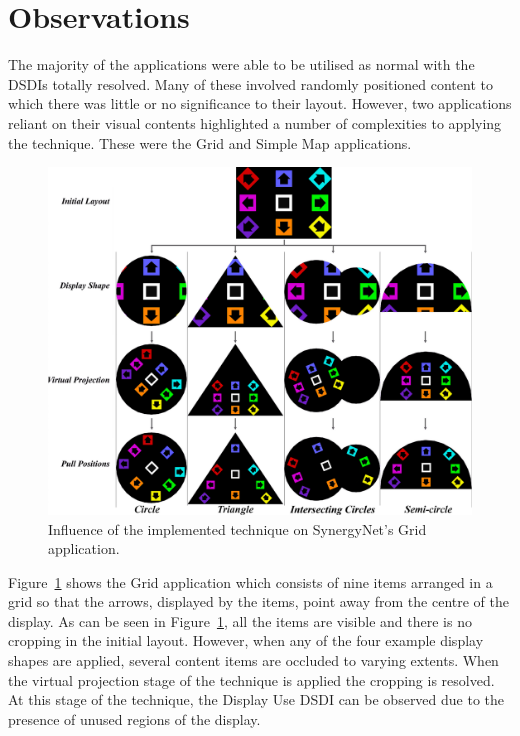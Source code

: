 \documentclass[review,5p,times,twocolumn]{elsarticle}
\begin{document}
\section{Observations}
\label{sec:observations}

The majority of the applications were able to be utilised as normal with the \acp{DSDI} totally resolved.
Many of these involved randomly positioned content to which there was little or no significance to their layout.
However, two applications reliant on their visual contents highlighted a number of complexities to applying the technique.
These were the Grid and Simple Map applications.

\begin{figure}[t!] 
	\centerline{\includegraphics[width=1\textwidth]{figures/grid_app.png}}
	\caption{Influence of the implemented technique on SynergyNet's Grid application.}
	\label{fig:gridApp}
\end{figure}

Figure~\ref{fig:gridApp} shows the Grid application which consists of nine items arranged in a grid so that the arrows, displayed by the items, point away from the centre of the display.  
As can be seen in Figure~\ref{fig:gridApp}, all the items are visible and there is no cropping in the initial layout.
However, when any of the four example display shapes are applied, several content items are occluded to varying extents.
When the virtual projection stage of the technique is applied the cropping is resolved.
At this stage of the technique, the Display Use \ac{DSDI} can be observed due to the presence of unused regions of the display.
\end{document}

